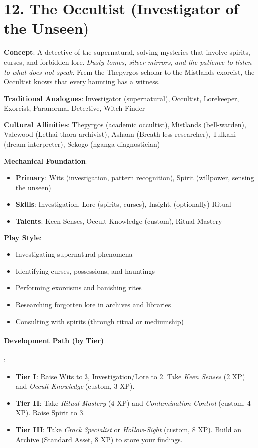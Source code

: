 \section{12. The Occultist (Investigator of the Unseen)}
\label{sec:concept-occultist}

\textbf{Concept}: A detective of the supernatural, solving mysteries that involve spirits, curses, and forbidden lore. \emph{Dusty tomes, silver mirrors, and the patience to listen to what does not speak.} From the Thepyrgos scholar to the Mistlands exorcist, the Occultist knows that every haunting has a witness.

\textbf{Traditional Analogues}: Investigator (supernatural), Occultist, Lorekeeper, Exorcist, Paranormal Detective, Witch-Finder

\textbf{Cultural Affinities}: Thepyrgos (academic occultist), Mistlands (bell-warden), Valewood (Lethai-thora archivist), Ashaan (Breath-less researcher), Tulkani (dream-interpreter), Sekogo (nganga diagnostician)

\textbf{Mechanical Foundation}:
\begin{itemize}
\item \textbf{Primary}: Wits (investigation, pattern recognition), Spirit (willpower, sensing the unseen)
\item \textbf{Skills}: Investigation, Lore (spirits, curses), Insight, (optionally) Ritual
\item \textbf{Talents}: Keen Senses, Occult Knowledge (custom), Ritual Mastery
\end{itemize}

\textbf{Play Style}:
\begin{itemize}
\item Investigating supernatural phenomena
\item Identifying curses, possessions, and hauntings
\item Performing exorcisms and banishing rites
\item Researching forgotten lore in archives and libraries
\item Consulting with spirits (through ritual or mediumship)
\end{itemize}

\paragraph{Development Path (by Tier)}:
\begin{itemize}
\item \textbf{Tier I}: Raise Wits to 3, Investigation/Lore to 2. Take \emph{Keen Senses} (2 XP) and \emph{Occult Knowledge} (custom, 3 XP).
\item \textbf{Tier II}: Take \emph{Ritual Mastery} (4 XP) and \emph{Contamination Control} (custom, 4 XP). Raise Spirit to 3.
\item \textbf{Tier III}: Take \emph{Crack Specialist} or \emph{Hollow-Sight} (custom, 8 XP). Build an Archive (Standard Asset, 8 XP) to store your findings.
\end{itemize}


